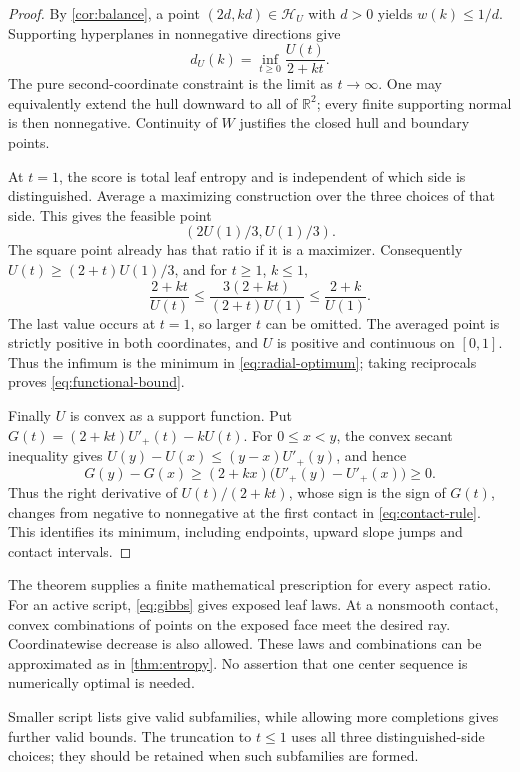 \documentclass[11pt]{article}
\numberwithin{equation}{section}
\theoremstyle{definition}
\theoremstyle{remark}
\newcommand{\R}{\mathbb R}
\newcommand{\calH}{\mathcal H}
\begin{document}
\begin{proof}
By \cref{cor:balance}, a point \((2d,kd)\in\calH_U\) with \(d>0\) yields
\(w(k)\le1/d\).
Supporting hyperplanes in nonnegative directions give
\[
 d_U(k)
    =\inf_{t\ge0}\frac{U(t)}{2+kt}.
\]
The pure second-coordinate constraint is the limit as \(t\to\infty\).
One may equivalently extend the hull downward to all of \(\R^2\);
every finite supporting normal is then nonnegative.
Continuity of \(W\) justifies the closed hull and boundary points.

At \(t=1\), the score is total leaf entropy and is independent of
which side is distinguished.
Average a maximizing construction over the three choices of that side.
This gives the feasible point
\[
 (2U(1)/3,U(1)/3).
\]
The square point already has that ratio if it is a maximizer.
Consequently \(U(t)\ge(2+t)U(1)/3\), and for \(t\ge1\), \(k\le1\),
\[
 \frac{2+kt}{U(t)}
 \le \frac{3(2+kt)}{(2+t)U(1)}
 \le \frac{2+k}{U(1)}.
\]
The last value occurs at \(t=1\), so larger \(t\) can be omitted.
The averaged point is strictly positive in both coordinates, and
\(U\) is positive and continuous on \([0,1]\).
Thus the infimum is the minimum in \eqref{eq:radial-optimum}; taking
reciprocals proves \eqref{eq:functional-bound}.

Finally \(U\) is convex as a support function.
Put \(G(t)=(2+kt)U'_+(t)-kU(t)\).
For \(0\le x<y\), the convex secant inequality gives
\(U(y)-U(x)\le(y-x)U'_+(y)\), and hence
\[
 G(y)-G(x)
 \ge (2+kx)\bigl(U'_+(y)-U'_+(x)\bigr)\ge0.
\]
Thus the right derivative of \(U(t)/(2+kt)\), whose sign is the sign
of \(G(t)\), changes from negative to nonnegative at the first
contact in \eqref{eq:contact-rule}.  This identifies its minimum,
including endpoints, upward slope jumps and contact intervals.
\end{proof}

The theorem supplies a finite mathematical prescription for every
aspect ratio.
For an active script, \eqref{eq:gibbs} gives exposed leaf laws.
At a nonsmooth contact, convex combinations of points on the exposed
face meet the desired ray.  Coordinatewise decrease is also allowed.
These laws and combinations can be approximated as in
\cref{thm:entropy}.
No assertion that one center sequence is numerically optimal is needed.

Smaller script lists give valid subfamilies, while allowing more
completions gives further valid bounds.
The truncation to \(t\le1\) uses all three distinguished-side choices;
they should be retained when such subfamilies are formed.
\end{document}
